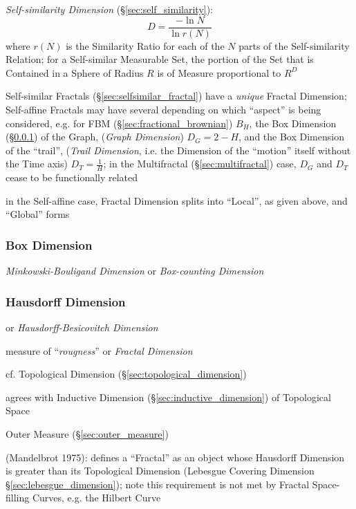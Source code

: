 \emph{Self-similarity Dimension} (\S\ref{sec:self_similarity}):
\[
  D = \frac{-\ln N}{\ln r(N)}
\]
where $r(N)$ is the Similarity Ratio for each of the $N$ parts of the
Self-similarity Relation;
for a Self-similar Measurable Set, the portion of the Set that is Contained in a
Sphere of Radius $R$ is of Measure proportional to $R^D$

Self-similar Fractals (\S\ref{sec:selfsimilar_fractal}) have a \emph{unique}
Fractal Dimension; Self-affine Fractals may have several depending on which
``aspect'' is being considered, e.g. for FBM (\S\ref{sec:fractional_brownian})
$B_H$, the Box Dimension (\S\ref{sec:box_dimension}) of the Graph,
(\emph{Graph Dimension}) $D_G = 2 - H$, and the Box Dimension of the ``trail'',
(\emph{Trail Dimension}, i.e. the Dimension of the ``motion'' itself without the
Time axis) $D_T = \frac{1}{H}$; in the Multifractal (\S\ref{sec:multifractal})
case, $D_G$ and $D_T$ cease to be functionally related

in the Self-affine case, Fractal Dimension splits into ``Local'', as given
above, and ``Global'' forms



\subsubsection{Box Dimension}\label{sec:box_dimension}

\emph{Minkowski-Bouligand Dimension} or \emph{Box-counting Dimension}



\subsubsection{Hausdorff Dimension}\label{sec:hausdorff_dimension}

or \emph{Hausdorff-Besicovitch Dimension}

measure of ``\emph{rougness}'' or \emph{Fractal Dimension}

cf. Topological Dimension (\S\ref{sec:topological_dimension})

agrees with Inductive Dimension (\S\ref{sec:inductive_dimension}) of Topological
Space

Outer Measure (\S\ref{sec:outer_measure})

(Mandelbrot 1975): defines a ``Fractal'' as an object whose Hausdorff Dimension
is greater than its Topological Dimension (Lebesgue Covering Dimension
\S\ref{sec:lebesgue_dimension}); note this requirement is not met by Fractal
Space-filling Curves, e.g. the Hilbert Curve

